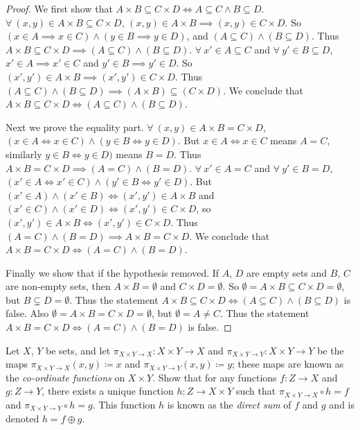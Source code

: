 \begin{proof}
We first show that \(A \times B \subseteq C \times D \iff A \subseteq C \land B \subseteq D\).
\(\forall\ (x, y) \in A \times B \subseteq C \times D\), \((x, y) \in A \times B \implies (x, y) \in C \times D\).
So \((x \in A \implies x \in C) \land (y \in B \implies y \in D)\), and \((A \subseteq C) \land (B \subseteq D)\).
Thus \(A \times B \subseteq C \times D \implies (A \subseteq C) \land (B \subseteq D)\).
\(\forall\ x' \in A \subseteq C\) and \(\forall\ y' \in B \subseteq D\), \(x' \in A \implies x' \in C\) and \(y' \in B \implies y' \in D\).
So \((x', y') \in A \times B \implies (x', y') \in C \times D\).
Thus \((A \subseteq C) \land (B \subseteq D) \implies (A \times B) \subseteq (C \times D)\).
We conclude that \(A \times B \subseteq C \times D \iff (A \subseteq C) \land (B \subseteq D)\).

Next we prove the equality part.
\(\forall\ (x, y) \in A \times B = C \times D\), \((x \in A \iff x \in C) \land (y \in B \iff y \in D)\).
But \(x \in A \iff x \in C\) means \(A = C\), similarly \(y \in B \iff y \in D)\) means \(B = D\).
Thus \(A \times B = C \times D \implies (A = C) \land (B = D)\).
\(\forall\ x' \in A = C\) and \(\forall\ y' \in B = D\), \((x' \in A \iff x' \in C) \land (y' \in B \iff y' \in D)\).
But \((x' \in A) \land (x' \in B) \iff (x', y') \in A \times B\) and \((x' \in C) \land (x' \in D) \iff (x', y') \in C \times D\), so \((x', y') \in A \times B \iff (x', y') \in C \times D\).
Thus \((A = C) \land (B = D) \implies A \times B = C \times D\).
We conclude that \(A \times B = C \times D \iff (A = C) \land (B = D)\).

Finally we show that if the hypothesis removed.
If \(A\), \(D\) are empty sets and \(B\), \(C\) are non-empty sets, then \(A \times B = \emptyset\) and \(C \times D = \emptyset\).
So \(\emptyset = A \times B \subseteq C \times D = \emptyset\), but \(B \subsetneq D = \emptyset\).
Thus the statement \(A \times B \subseteq C \times D \iff (A \subseteq C) \land (B \subseteq D)\) is false.
Also \(\emptyset = A \times B = C \times D = \emptyset\), but \(\emptyset = A \neq C\).
Thus the statement \(A \times B = C \times D \iff (A = C) \land (B = D)\) is false.
\end{proof}

\begin{exercise}\label{ex 3.5.7}
Let \(X\), \(Y\) be sets, and let \(\pi_{X \times Y \to X} : X \times Y \to X\) and \(\pi_{X \times Y \to Y} : X \times Y \to Y\) be the maps \(\pi_{X \times Y \to X}(x, y) \coloneqq x\) and \(\pi_{X \times Y \to Y}(x, y) \coloneqq y\);
these maps are known as the \emph{co-ordinate functions} on \(X \times Y\).
Show that for any functions \(f : Z \to X\) and \(g : Z \to Y\), there exists a unique function \(h : Z \to X \times Y\) such that \(\pi_{X \times Y \to X} \circ h = f\) and \(\pi_{X \times Y \to Y} \circ h = g\).
This function \(h\) is known as the \emph{direct sum} of \(f\) and \(g\) and is denoted \(h = f \oplus g\).
\end{exercise}

